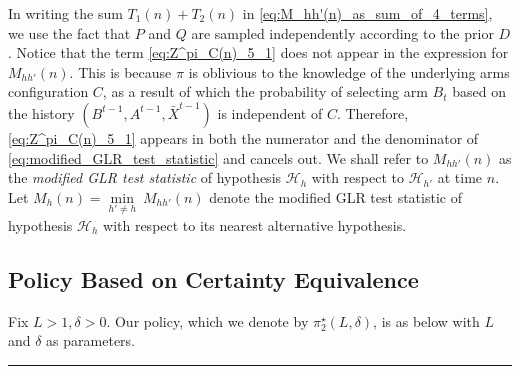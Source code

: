 In writing the sum $T_1(n)+T_2(n)$ in \eqref{eq:M_hh'(n)_as_sum_of_4_terms}, we use the fact that $P$ and $Q$ are sampled independently according to the prior $D$. Notice that the term \eqref{eq:Z^pi_C(n)_5_1} does not appear in the expression for $M_{hh'}(n)$. This is because $\pi$ is oblivious to the knowledge of the underlying arms configuration $C$, as a result of which the probability of selecting arm $B_t$ based on the history $(B^{t-1}, A^{t-1}, \bar{X}^{t-1})$ is independent of $C$. Therefore, \eqref{eq:Z^pi_C(n)_5_1} appears in both the numerator and the denominator of \eqref{eq:modified_GLR_test_statistic} and cancels out. We shall refer to $M_{hh'}(n)$ as the {\em modified GLR test statistic} of hypothesis $\mathcal{H}_h$ with respect to $\mathcal{H}_{h'}$ at time $n$. 
Let $M_h(n)=\min\limits_{h'\neq h}~M_{hh'}(n)$ denote the modified GLR test statistic of hypothesis $\mathcal{H}_h$ with respect to its nearest alternative hypothesis.

\subsection{Policy Based on Certainty Equivalence}

Fix $L>1, \delta>0$. Our policy, which we denote by $\pi_2^\star(L, \delta)$, is as below with $L$ and $\delta$ as parameters.
\vspace{.1in}
\hrule

\vspace{.1in}

